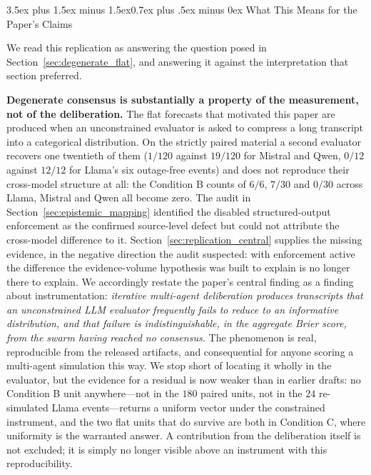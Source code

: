\documentclass[11pt,journal,onecolumn]{IEEEtran}
\makeatletter
\renewcommand\subsection{\@startsection{subsection}{2}{\z@}%
  {3.5ex plus 1.5ex minus 1.5ex}{0.7ex plus .5ex minus 0ex}%
  {\normalfont\normalsize\bfseries}}
\makeatother
\begin{document}
\subsection{What This Means for the Paper's Claims}
\label{sec:replication_implications}

We read this replication as answering the question posed in Section~\ref{sec:degenerate_flat}, and answering it against the interpretation that section preferred.

\textbf{Degenerate consensus is substantially a property of the measurement, not of the deliberation.} The flat forecasts that motivated this paper are produced when an unconstrained evaluator is asked to compress a long transcript into a categorical distribution. On the strictly paired material a second evaluator recovers one twentieth of them ($1/120$ against $19/120$ for Mistral and Qwen, $0/12$ against $12/12$ for Llama's six outage-free events) and does not reproduce their cross-model structure at all: the Condition B counts of $6/6$, $7/30$ and $0/30$ across Llama, Mistral and Qwen all become zero. The audit in Section~\ref{sec:epistemic_mapping} identified the disabled structured-output enforcement as the confirmed source-level defect but could not attribute the cross-model difference to it. Section~\ref{sec:replication_central} supplies the missing evidence, in the negative direction the audit suspected: with enforcement active the difference the evidence-volume hypothesis was built to explain is no longer there to explain. We accordingly restate the paper's central finding as a finding about instrumentation: \emph{iterative multi-agent deliberation produces transcripts that an unconstrained LLM evaluator frequently fails to reduce to an informative distribution, and that failure is indistinguishable, in the aggregate Brier score, from the swarm having reached no consensus.} The phenomenon is real, reproducible from the released artifacts, and consequential for anyone scoring a multi-agent simulation this way. We stop short of locating it wholly in the evaluator, but the evidence for a residual is now weaker than in earlier drafts: no Condition B unit anywhere---not in the $180$ paired units, not in the $24$ re-simulated Llama events---returns a uniform vector under the constrained instrument, and the two flat units that do survive are both in Condition C, where uniformity is the warranted answer. A contribution from the deliberation itself is not excluded; it is simply no longer visible above an instrument with this reproducibility.
\end{document}
